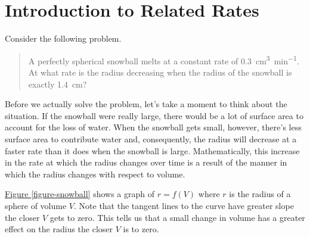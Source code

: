 \documentclass[10pt,oneside,]{book}
\theoremstyle{plain}
\theoremstyle{definition}
\numberwithin{equation}{section}
\newcounter{figstack}
\newcounter{figindex}
\newlength\fight
\newcommand\pushValignCaptionBottom[5][b]{%
\stepcounter{figstack}%
\expandafter\def\csname %
figalign\romannumeral\value{figstack}\endcsname{#1}%
\expandafter\def\csname %
figtype\romannumeral\value{figstack}\endcsname{#2}%
\expandafter\def\csname %
figwd\romannumeral\value{figstack}\endcsname{#3}%
\expandafter\def\csname %
figcontent\romannumeral\value{figstack}\endcsname{#4}%
\expandafter\def\csname %
figcap\romannumeral\value{figstack}\endcsname{#5}%
\setbox0=\hbox{%
\begin{#2}{#3}#4\end{#2}}%
\ifdim\dimexpr\ht0+\dp0\relax>\fight\global\setlength{\fight}{%
\dimexpr\ht0+\dp0\relax}\fi%
}
\newcommand\popValignCaptionBottom{%
\setcounter{figindex}{0}%
\hfill%
\whiledo{\value{figindex}<\value{figstack}}{%
\stepcounter{figindex}%
\def\tmp{\csname figwd\romannumeral\value{figindex}\endcsname}%
\begin{\csname figtype\romannumeral\value{figindex}\endcsname}[t]{\tmp}%
\centering%
\stackinset{c}{}%
{\csname figalign\romannumeral\value{figindex}\endcsname}{}%
{\csname figcontent\romannumeral\value{figindex}\endcsname}%
{\rule{0pt}{\fight}}\par%
\csname figcap\romannumeral\value{figindex}\endcsname%
\end{\csname figtype\romannumeral\value{figindex}\endcsname}%
\hfill%
}%
\setcounter{figstack}{0}%
\setlength{\fight}{0pt}%
\hfill%
}
\newcommand{\fe}[2]{#1\mathopen{}\left(#2\right)\mathclose{}}
\begin{document}
\section[Introduction to Related Rates]{Introduction to Related Rates}\label{section-introduction-related-rates}
Consider the following problem.%
\begin{quote}A perfectly spherical snowball melts at a constant rate of \SI{0.3}{\centi\meter\tothe{3}\per\minute}. At what rate is the radius decreasing when the radius of the snowball is exactly \SI{1.4}{\centi\meter}?\end{quote}\par
Before we actually solve the problem, let's take a moment to think about the situation. If the snowball were really large, there would be a lot of surface area to account for the loss of water. When the snowball gets small, however, there's less surface area to contribute water and, consequently, the radius will decrease at a faster rate than it does when the snowball is large. Mathematically, this increase in the rate at which the radius changes over time is a result of the manner in which the radius changes with respect to volume.%
\par
\hyperref[figure-snowball]{Figure \ref{figure-snowball}} shows a graph of \(r=\fe{f}{V}\) where \(r\) is the radius of a sphere of volume \(V\). Note that the tangent lines to the curve have greater slope the closer \(V\) gets to zero. This tells us that a small change in volume has a greater effect on the radius the closer \(V\) is to zero. %
\end{document}
